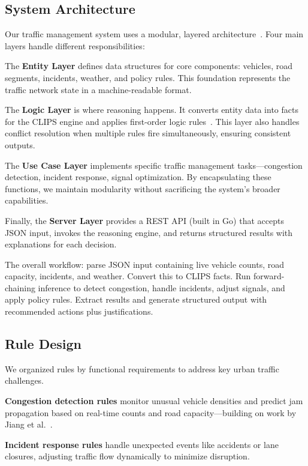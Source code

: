 \documentclass{article}
\begin{document}
\subsection{System Architecture}
Our traffic management system uses a modular, layered architecture~\cite{karagiannis_domain_2016}. Four main layers handle different responsibilities:

The \textbf{Entity Layer} defines data structures for core components: vehicles, road segments, incidents, weather, and policy rules. This foundation represents the traffic network state in a machine-readable format.

The \textbf{Logic Layer} is where reasoning happens. It converts entity data into facts for the CLIPS engine and applies first-order logic rules~\cite{xu_consistency_2006}. This layer also handles conflict resolution when multiple rules fire simultaneously, ensuring consistent outputs.

The \textbf{Use Case Layer} implements specific traffic management tasks—congestion detection, incident response, signal optimization. By encapsulating these functions, we maintain modularity without sacrificing the system's broader capabilities.

Finally, the \textbf{Server Layer} provides a REST API (built in Go) that accepts JSON input, invokes the reasoning engine, and returns structured results with explanations for each decision.

The overall workflow: parse JSON input containing live vehicle counts, road capacity, incidents, and weather. Convert this to CLIPS facts. Run forward-chaining inference to detect congestion, handle incidents, adjust signals, and apply policy rules. Extract results and generate structured output with recommended actions plus justifications.

\subsection{Rule Design}
We organized rules by functional requirements to address key urban traffic challenges. 

\textbf{Congestion detection rules} monitor unusual vehicle densities and predict jam propagation based on real-time counts and road capacity—building on work by Jiang et al.~\cite{jiang_spatiotemporal_2017}. 

\textbf{Incident response rules} handle unexpected events like accidents or lane closures, adjusting traffic flow dynamically to minimize disruption.
\end{document}

